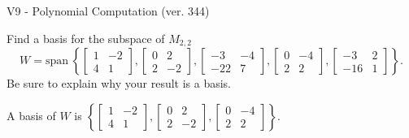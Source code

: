 \begin{exercise}
  \begin{exerciseTitle}V9 - Polynomial Computation (ver. 344)\end{exerciseTitle}
  \begin{exerciseStatement}
    Find a basis for the subspace of \(M_{2,2}\) 
\[W=\mathrm{span}\ \left\{\left[\begin{array}{cc}
1 & -2 \\
4 & 1
\end{array}\right] , \left[\begin{array}{cc}
0 & 2 \\
2 & -2
\end{array}\right] , \left[\begin{array}{cc}
-3 & -4 \\
-22 & 7
\end{array}\right] , \left[\begin{array}{cc}
0 & -4 \\
2 & 2
\end{array}\right] , \left[\begin{array}{cc}
-3 & 2 \\
-16 & 1
\end{array}\right]\right\}.\]
 Be sure to explain why your result is a basis.


  \end{exerciseStatement}
  \begin{exerciseAnswer}
   A basis of \(W\) is  \(\left\{\left[\begin{array}{cc}
1 & -2 \\
4 & 1
\end{array}\right] , \left[\begin{array}{cc}
0 & 2 \\
2 & -2
\end{array}\right] , \left[\begin{array}{cc}
0 & -4 \\
2 & 2
\end{array}\right]\right\}\).
  


  \end{exerciseAnswer}
\end{exercise}
